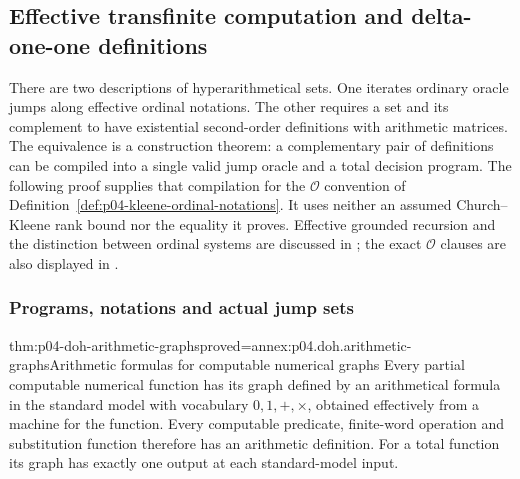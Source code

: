 \subsection{Effective transfinite computation and delta-one-one definitions}
\label{sec:p04-delta-one-hyperarithmetical}

There are two descriptions of hyperarithmetical sets. One iterates ordinary
oracle jumps along effective ordinal notations. The other requires a set and
its complement to have existential second-order definitions with arithmetic
matrices. The equivalence is a construction theorem: a complementary pair of
definitions can be compiled into a single valid jump oracle and a total
decision program. The following proof supplies that compilation for the
\(\mathcal O\) convention of
Definition~\ref{def:p04-kleene-ordinal-notations}.
It uses neither an assumed Church--Kleene rank bound nor the equality it
proves. Effective grounded recursion and the distinction between ordinal
systems are discussed in \cite[\S\S2A--3E]{Moschovakis2016HYPAuthorManuscript};
the exact \(\mathcal O\) clauses are also displayed in
\cite[\S2.3]{Speranski2017TruthAuthorPreprint}.

\subsubsection{Programs, notations and actual jump sets}

\begin{hblemma}{thm:p04-doh-arithmetic-graphs}{proved=annex:p04.doh.arithmetic-graphs}{Arithmetic formulas for computable numerical graphs}
Every partial computable numerical function has its graph defined by an
arithmetical formula in the standard model with vocabulary
\(0,1,+,\times\), obtained effectively from a machine for the function.
Every computable predicate, finite-word operation and substitution function
therefore has an arithmetic definition. For a total function its graph
has exactly one output at each standard-model input.
\end{hblemma}

